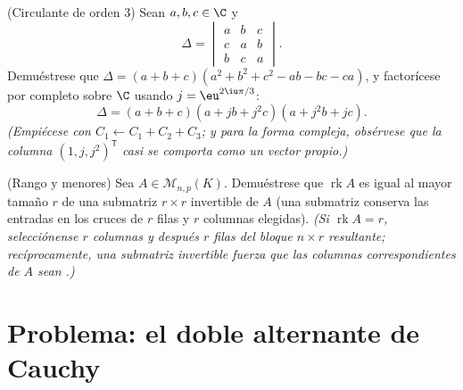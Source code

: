 \begin{exercise}[$\star\star$]\label{exo:b1:det:11}
(Circulante de orden $3$) Sean $a, b, c \in \C$ y
\[
\Delta = \begin{vmatrix}
a & b & c\\
c & a & b\\
b & c & a
\end{vmatrix}.
\]
Demuéstrese que
$\Delta = (a + b + c)(a^2 + b^2 + c^2 - ab - bc - ca)$, y
factorícese por completo sobre $\C$ usando $j = \eu^{2\iu\pi/3}$:
\[
\Delta = (a + b + c)(a + jb + j^2c)(a + j^2b + jc) .
\]
\emph{(Empiécese con $C_1 \leftarrow C_1 + C_2 + C_3$; y para la
forma compleja, obsérvese que la columna $(1, j, j^2)^{\mathsf T}$
casi se comporta como un vector propio.)}
\end{exercise}

\begin{exercise}[$\star\star\star$]\label{exo:b1:det:12}
(Rango y menores) Sea $A \in \mathcal{M}_{n,p}(K)$. Demuéstrese que
$\operatorname{rk} A$ es igual al mayor tamaño $r$ de una submatriz
$r \times r$ invertible de $A$ (una submatriz conserva las entradas
en los cruces de $r$ filas y $r$ columnas elegidas). \emph{(Si
$\operatorname{rk} A = r$, selecciónense $r$ columnas  y
después $r$ filas  del bloque $n \times r$ resultante;
recíprocamente, una submatriz invertible fuerza que las columnas
correspondientes de $A$ sean .)}
\end{exercise}

\section{Problema: el doble alternante de Cauchy}

